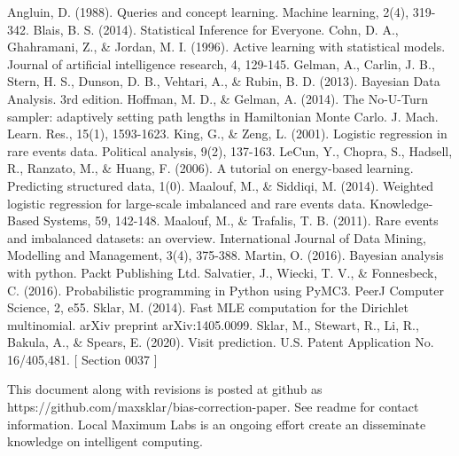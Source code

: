 \documentclass[twoside]{article}
\begin{document}
\begin{thebibliography}{20}

Angluin, D. (1988). Queries and concept learning. Machine learning, 2(4), 319-342.
Blais, B. S. (2014). Statistical Inference for Everyone.
Cohn, D. A., Ghahramani, Z., \& Jordan, M. I. (1996). Active learning with statistical models. Journal of artificial intelligence research, 4, 129-145.
Gelman, A., Carlin, J. B., Stern, H. S., Dunson, D. B., Vehtari, A., \& Rubin, B. D. (2013). Bayesian Data Analysis. 3rd edition.
Hoffman, M. D., \& Gelman, A. (2014). The No-U-Turn sampler: adaptively setting path lengths in Hamiltonian Monte Carlo. J. Mach. Learn. Res., 15(1), 1593-1623.
King, G., \& Zeng, L. (2001). Logistic regression in rare events data. Political analysis, 9(2), 137-163.
LeCun, Y., Chopra, S., Hadsell, R., Ranzato, M., \& Huang, F. (2006). A tutorial on energy-based learning. Predicting structured data, 1(0).
Maalouf, M., \& Siddiqi, M. (2014). Weighted logistic regression for large-scale imbalanced and rare events data. Knowledge-Based Systems, 59, 142-148.
Maalouf, M., \& Trafalis, T. B. (2011). Rare events and imbalanced datasets: an overview. International Journal of Data Mining, Modelling and Management, 3(4), 375-388.
Martin, O. (2016). Bayesian analysis with python. Packt Publishing Ltd.
Salvatier, J., Wiecki, T. V., \& Fonnesbeck, C. (2016). Probabilistic programming in Python using PyMC3. PeerJ Computer Science, 2, e55.
Sklar, M. (2014). Fast MLE computation for the Dirichlet multinomial. arXiv preprint arXiv:1405.0099.
Sklar, M., Stewart, R., Li, R., Bakula, A., \& Spears, E. (2020). Visit prediction. U.S. Patent Application No. 16/405,481. [ Section 0037 ]

\end{thebibliography}

This document along with revisions is posted at github as https://github.com/maxsklar/bias-correction-paper. See readme for contact information. Local Maximum Labs is an ongoing effort create an disseminate knowledge on intelligent computing.
\end{document}
